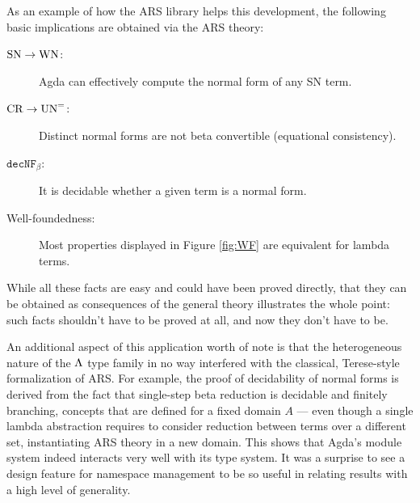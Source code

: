 As an example of how the ARS library helps this development, the following basic implications are obtained via the ARS theory:
\begin{description}
  \item[$\mathrm{SN} \to \mathrm{WN}$:] Agda can effectively compute the normal form of any SN term.
  \item[$\mathrm{CR} \to \mathrm{UN}^{=}$:] Distinct normal forms are not beta convertible (equational consistency).
  \item[$\mathtt{dec NF_\beta}$:] It is decidable whether a given term is a normal form.
  \item[Well-foundedness:] Most properties displayed in Figure \ref{fig:WF} are equivalent for lambda terms.
\end{description}
While all these facts are easy and could have been proved directly, that they can be obtained as consequences of the general theory 
illustrates the whole point: such facts shouldn't have to be proved at all, and now they don't have to be.

An additional aspect of this application worth of note is that the heterogeneous nature of the $\Lambda$ type family in no way interfered with the classical, Terese-style 
formalization of ARS. For example, the proof of decidability of normal forms is derived from the fact that single-step beta reduction is 
decidable and finitely branching, concepts that are defined for a fixed domain $A$ --- even though a single lambda abstraction requires to consider 
reduction between terms over a different set, instantiating ARS theory in a new domain.
This shows that Agda's module system indeed interacts very well with its type system. 
It was a surprise to see a design feature for namespace management to be so useful in relating results with a high level of generality.

